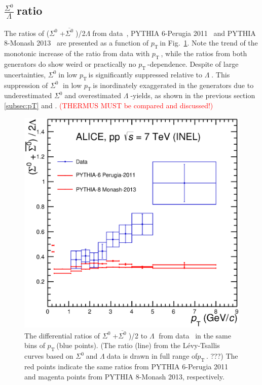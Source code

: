 \documentclass[ALICE,manyauthors]{cernphprep}
\newcommand{\siglam}{\ensuremath{\frac{\Sigma^0}{\Lambda} \; }}
\newcommand{\sig}{\ensuremath{\Sigma^0  \; }}
\newcommand{\asig}{\ensuremath{\overline{\Sigma^0} \; }}
\newcommand{\lam}{\ensuremath{\Lambda \; }}
\newcommand{\pt}{\ensuremath{p_{\mathrm{T}\; }}}
\newcommand{\red}{\textcolor{red}}
\begin{document}
 \subsection{\siglam ratio}  
\label{subsec:diff_ratio}

The ratios of (\sig+\asig)/2\lam from data~\cite{cite:ALICE-LF}, PYTHIA 6-Perugia 2011~\cite{cite:pythia6} 
and PYTHIA 8-Monash 2013~\cite{cite:PYTHIA-8-Monash-gener} are presented as a function of \pt in 
Fig.~\ref{fig:siglam-ptdepratio}. Note the trend of the monotonic increase of the ratio from data with \pt,
while the ratios from both generators do show weird or practically no \pt-dependence.
Despite of large uncertainties, \sig in low \pt is significantly suppressed relative to \lam. This suppression of \sig
in low \pt   is inordinately exaggerated in the generators due to underestimated \sig and overestimated \lam-yields,
as shown in the previous section \ref{subsec:pT} and \cite{cite:ALICE-LF}. 
\red{(THERMUS MUST be compared and discussed!)} \\

\begin{figure}[h!]
  \centering

   \includegraphics[width=10.cm]{Figure/ratio-Sigma0Lambda-7mar18.eps}

    \caption{ The differential ratios of \sig+\asig)/2 to \lam 
    from data~\cite{cite:ALICE-LF}  in the same bins of \pt (blue points). (The ratio (line) from the L\'{e}vy-Tsallis 
     curves based on \sig and \lam data is drawn     in full range of\pt. ???)
 The red points indicate the same ratios from PYTHIA 6-Perugia 2011 and magenta points from PYTHIA 8-Monash 2013, 
    respectively.
}
    \label{fig:siglam-ptdepratio}
\end{figure}
\end{document}
